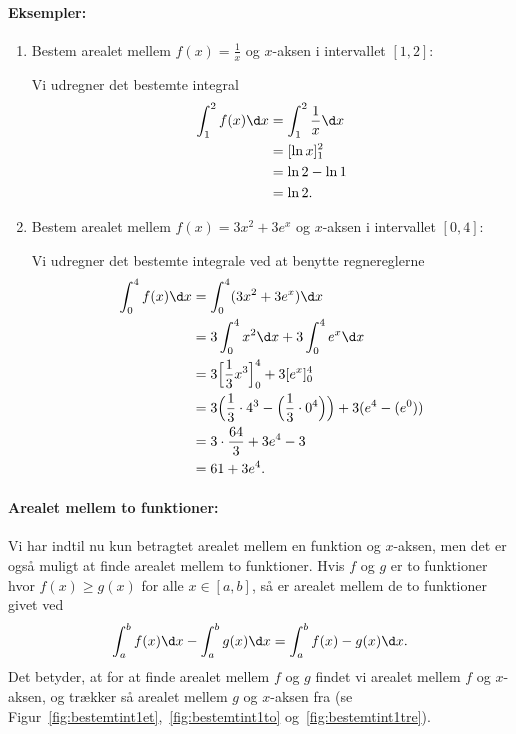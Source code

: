 \paragraph*{Eksempler:}
\begin{enumerate}
\item Bestem arealet mellem $f(x)=\frac{1}{x}$ og $x$-aksen i intervallet $[1,2]$:

Vi udregner det bestemte integral
\begin{align*}
\int_1^2 f(x) \d x &= \int_1^2 \frac{1}{x} \d x \\
&=[\ln x]_1^2 \\
&=\ln 2 - \ln 1 \\
&=\ln 2.
\end{align*}

\item Bestem arealet mellem $f(x)=3x^2+3e^x$ og $x$-aksen i intervallet $[0,4]$:

Vi udregner det bestemte integrale ved at benytte regnereglerne
\begin{align*}
\int_0^4 f(x) \d x &= \int_0^4 (3x^2+3e^x) \d x \\
&= 3\int_0^4 x^2 \d x+ 3 \int_0^4 e^x \d x \\
&= 3\Big[ \frac{1}{3}x^3 \Big]_0^4 + 3[e^x]_0^4 \\
&=3 \Big(\frac{1}{3}\cdot 4^3 - \Big(\frac{1}{3} \cdot 0^4 \Big) \Big) + 3 ( e^4 - (e^0)) \\
&=3 \cdot \frac{64}{3} + 3e^4-3\\
&=61+3e^4.
\end{align*}
\end{enumerate}

\paragraph*{Arealet mellem to funktioner:}
Vi har indtil nu kun betragtet arealet mellem en funktion og $x$-aksen, men det er også muligt at finde arealet mellem to funktioner. Hvis $f$ og $g$ er to funktioner hvor $f(x) \geq g(x)$ for alle $x \in [a,b]$, så er arealet mellem de to funktioner givet ved
\begin{align*}
\int_a^b f(x) \d x - \int_a^b g(x) \d x = \int_a^b f(x) - g(x) \d x.
\end{align*}
Det betyder, at for at finde arealet mellem $f$ og $g$ findet vi arealet mellem $f$ og $x$-aksen, og trækker så arealet mellem $g$ og $x$-aksen fra (se Figur~\ref{fig:bestemtint1et},~\ref{fig:bestemtint1to} og~\ref{fig:bestemtint1tre}).


